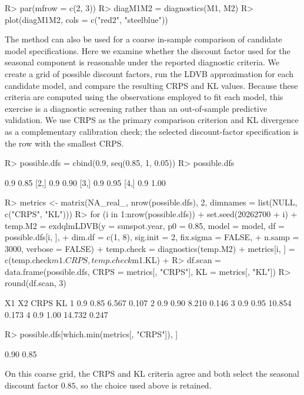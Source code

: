 \documentclass{jss}
\begin{document}
\begin{CodeChunk}
\begin{CodeInput}
R> par(mfrow = c(2, 3))
R> diagM1M2 = diagnostics(M1, M2)
R> plot(diagM1M2, cols = c("red2", "steelblue"))
\end{CodeInput}
\end{CodeChunk}

The  method can also be used for a coarse in-sample comparison of candidate model specifications. Here we examine whether the discount factor used for the seasonal component is reasonable under the reported diagnostic criteria. We create a grid of possible discount factors, run the LDVB approximation for each candidate model, and compare the resulting CRPS and KL values. Because these criteria are computed using the observations employed to fit each model, this exercise is a diagnostic screening rather than an out-of-sample predictive validation. We use CRPS as the primary comparison criterion and KL divergence as a complementary calibration check; the selected discount-factor specification is the row with the smallest CRPS.

\begin{CodeChunk}
\begin{CodeInput}
R> possible.dfs = cbind(0.9, seq(0.85, 1, 0.05))
R> possible.dfs
\end{CodeInput}
\begin{CodeOutput}
     [,1] [,2]
[1,]  0.9 0.85
[2,]  0.9 0.90
[3,]  0.9 0.95
[4,]  0.9 1.00
\end{CodeOutput}
\begin{CodeInput}
R> metrics <- matrix(NA_real_, nrow(possible.dfs), 2, dimnames = list(NULL, c("CRPS", "KL")))
R> for (i in 1:nrow(possible.dfs)) {
+   set.seed(20262700 + i)
+   temp.M2 = exdqlmLDVB(y = sunspot.year, p0 = 0.85, model = model, df = possible.dfs[i, ],
+                  dim.df = c(1, 8), sig.init = 2, fix.sigma = FALSE,
+                  n.samp = 3000, verbose = FALSE)
+   temp.check = diagnostics(temp.M2)
+   metrics[i, ] = c(temp.check$m1.CRPS, temp.check$m1.KL)
+ }
R> df.scan = data.frame(possible.dfs, CRPS = metrics[, "CRPS"], KL = metrics[, "KL"])
R> round(df.scan, 3)
\end{CodeInput}
\begin{CodeOutput}
   X1   X2   CRPS    KL
1 0.9 0.85  6.567 0.107
2 0.9 0.90  8.210 0.146
3 0.9 0.95 10.854 0.173
4 0.9 1.00 14.732 0.247
\end{CodeOutput}
\begin{CodeInput}
R> possible.dfs[which.min(metrics[, "CRPS"]), ]
\end{CodeInput}
\begin{CodeOutput}
[1] 0.90 0.85
\end{CodeOutput}
\end{CodeChunk}
On this coarse grid, the CRPS and KL criteria agree and both select the seasonal discount factor \(0.85\), so the choice used above is retained.
\end{document}
